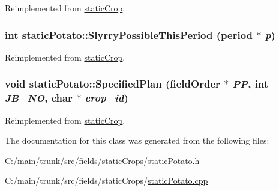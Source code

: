 Reimplemented from \hyperlink{classstatic_crop_ae4f07498c1616eab212386faf352d348}{staticCrop}.\hypertarget{classstatic_potato_aca4f659ad1d189547df0b8336e8abcf6}{
\subsubsection[{SlyrryPossibleThisPeriod}]{\setlength{\rightskip}{0pt plus 5cm}int staticPotato::SlyrryPossibleThisPeriod ({\bf period} $\ast$ {\em p})}}
\label{classstatic_potato_aca4f659ad1d189547df0b8336e8abcf6}


Reimplemented from \hyperlink{classstatic_crop_ada7c8c797de629277a5ba0b0a4a3c17e}{staticCrop}.\hypertarget{classstatic_potato_aa6aed82be9c7c1e9e678bae6fdd7422c}{
\subsubsection[{SpecifiedPlan}]{\setlength{\rightskip}{0pt plus 5cm}void staticPotato::SpecifiedPlan ({\bf fieldOrder} $\ast$ {\em PP}, \/  int {\em JB\_\-NO}, \/  char $\ast$ {\em crop\_\-id})}}
\label{classstatic_potato_aa6aed82be9c7c1e9e678bae6fdd7422c}


Reimplemented from \hyperlink{classstatic_crop_af19d8a1e4f4833325f6712c22ede8b45}{staticCrop}.

The documentation for this class was generated from the following files:\begin{DoxyCompactItemize}
\item 
C:/main/trunk/src/fields/staticCrops/\hyperlink{static_potato_8h}{staticPotato.h}\item 
C:/main/trunk/src/fields/staticCrops/\hyperlink{static_potato_8cpp}{staticPotato.cpp}\end{DoxyCompactItemize}
